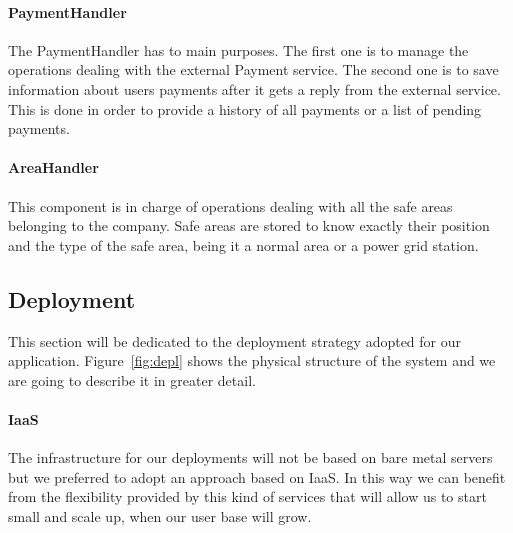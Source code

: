 \paragraph{PaymentHandler}
The PaymentHandler has to main purposes. The first one is to manage the operations dealing
with the external Payment service. The second one is to save information about users payments
after it gets a reply from the external service. 
This is done in order to provide a history of all payments or a list of pending payments.


\paragraph{AreaHandler}
This component is in charge of operations dealing with all the safe areas belonging to the company.
Safe areas are stored to know exactly their position and the type of the safe area, being it
a normal area or a power grid station.

\pagebreak

\subsection{Deployment}
This section will be dedicated to the deployment strategy adopted for our application. Figure~\ref{fig:depl}
shows the physical structure of the system and we are going to describe it in greater detail.

\paragraph{IaaS} The infrastructure for our deployments will not be based on bare metal servers
but we preferred to adopt an approach based on IaaS. In this way we can benefit from the
flexibility provided by this kind of services that will allow us to start small and scale
up, when our user base will grow.  

